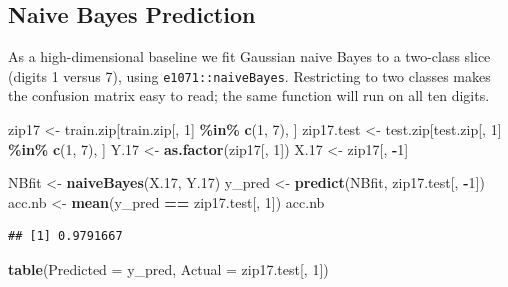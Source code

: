 \documentclass[
]{book}
\newenvironment{Shaded}{\begin{snugshade}}{\end{snugshade}}
\newcommand{\AttributeTok}[1]{\textcolor[rgb]{0.13,0.29,0.53}{#1}}
\newcommand{\DecValTok}[1]{\textcolor[rgb]{0.00,0.00,0.81}{#1}}
\newcommand{\FloatTok}[1]{\textcolor[rgb]{0.00,0.00,0.81}{#1}}
\newcommand{\FunctionTok}[1]{\textcolor[rgb]{0.13,0.29,0.53}{\textbf{#1}}}
\newcommand{\NormalTok}[1]{#1}
\newcommand{\OtherTok}[1]{\textcolor[rgb]{0.56,0.35,0.01}{#1}}
\newcommand{\SpecialCharTok}[1]{\textcolor[rgb]{0.81,0.36,0.00}{\textbf{#1}}}
\begin{document}
\subsection*{Naive Bayes Prediction}\label{naive-bayes-prediction}

As a high-dimensional baseline we fit Gaussian naive Bayes to a two-class slice (digits 1 versus 7), using \texttt{e1071::naiveBayes}. Restricting to two classes makes the confusion matrix easy to read; the same function will run on all ten digits.

\begin{Shaded}
\begin{Highlighting}[]
\NormalTok{zip17 }\OtherTok{\textless{}{-}}\NormalTok{ train.zip[train.zip[, }\DecValTok{1}\NormalTok{] }\SpecialCharTok{\%in\%} \FunctionTok{c}\NormalTok{(}\DecValTok{1}\NormalTok{, }\DecValTok{7}\NormalTok{), ]}
\NormalTok{zip17.test }\OtherTok{\textless{}{-}}\NormalTok{ test.zip[test.zip[, }\DecValTok{1}\NormalTok{] }\SpecialCharTok{\%in\%} \FunctionTok{c}\NormalTok{(}\DecValTok{1}\NormalTok{, }\DecValTok{7}\NormalTok{), ]}
\NormalTok{Y}\FloatTok{.17} \OtherTok{\textless{}{-}} \FunctionTok{as.factor}\NormalTok{(zip17[, }\DecValTok{1}\NormalTok{])}
\NormalTok{X}\FloatTok{.17} \OtherTok{\textless{}{-}}\NormalTok{ zip17[, }\SpecialCharTok{{-}}\DecValTok{1}\NormalTok{]}

\NormalTok{NBfit }\OtherTok{\textless{}{-}} \FunctionTok{naiveBayes}\NormalTok{(X}\FloatTok{.17}\NormalTok{, Y}\FloatTok{.17}\NormalTok{)}
\NormalTok{y\_pred }\OtherTok{\textless{}{-}} \FunctionTok{predict}\NormalTok{(NBfit, zip17.test[, }\SpecialCharTok{{-}}\DecValTok{1}\NormalTok{])}
\NormalTok{acc.nb }\OtherTok{\textless{}{-}} \FunctionTok{mean}\NormalTok{(y\_pred }\SpecialCharTok{==}\NormalTok{ zip17.test[, }\DecValTok{1}\NormalTok{])}
\NormalTok{acc.nb}
\end{Highlighting}
\end{Shaded}

\begin{verbatim}
## [1] 0.9791667
\end{verbatim}

\begin{Shaded}
\begin{Highlighting}[]
\FunctionTok{table}\NormalTok{(}\AttributeTok{Predicted =}\NormalTok{ y\_pred, }\AttributeTok{Actual =}\NormalTok{ zip17.test[, }\DecValTok{1}\NormalTok{])}
\end{Highlighting}
\end{Shaded}
\end{document}
